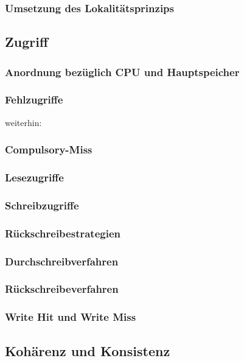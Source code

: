 \subsubsection{Umsetzung des Lokalitätsprinzips}

\subsection{Zugriff}
\subsubsection{Anordnung bezüglich CPU und Hauptspeicher}
\subsubsection{Fehlzugriffe}
weiterhin:
\subsubsection*{Compulsory-Miss}

\subsubsection{Lesezugriffe}

\subsubsection{Schreibzugriffe}
\subsubsection*{Rückschreibestrategien}
\subsubsection*{Durchschreibverfahren}
\subsubsection*{Rückschreibeverfahren}
\subsubsection*{Write Hit und Write Miss}

\subsection{Kohärenz und Konsistenz}
